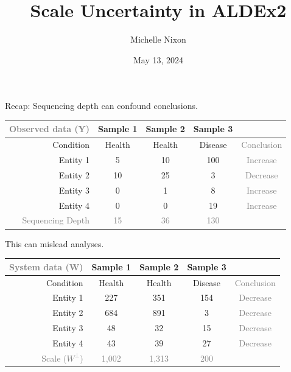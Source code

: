 \documentclass[
  ignorenonframetext,
]{beamer}
\title{Scale Uncertainty in ALDEx2}
\author{Michelle Nixon}
\date{May 13, 2024}
\begin{document}
\frame{\titlepage}

\begin{frame}{Recap: Sequencing depth can confound conclusions.}
\protect\hypertarget{recap-sequencing-depth-can-confound-conclusions.}{}
\begin{table}[h!]
\centering
\begin{tabular}{|r|c c c| c|}
\hline
\textcolor{gray}{Observed data (Y)} & Sample 1 & Sample 2 & Sample 3  &\\
\hline
Condition & Health & Health & Disease & \textcolor{gray}{Conclusion}\\
\hline
Entity 1 & 5 & 10 & 100 & \textcolor{gray}{Increase}\\
Entity 2 & 10 & 25 & 3 & \textcolor{gray}{Decrease}\\
Entity 3 & 0 & 1 & 8 & \textcolor{gray}{Increase}\\
Entity 4 & 0 & 0 & 19 &\textcolor{gray}{Increase}\\
\hline
\textcolor{gray}{Sequencing Depth} & \textcolor{gray}{15} & \textcolor{gray}{36} & \textcolor{gray}{130} &\\
\hline
\end{tabular}
\end{table}
\end{frame}

\begin{frame}{This can mislead analyses.}
\protect\hypertarget{this-can-mislead-analyses.}{}
\begin{table}[h!]
\centering
\begin{tabular}{|r|c c c| c|}
\hline
\textcolor{gray}{System data (W)} & Sample 1 & Sample 2 & Sample 3  & \\
\hline
Condition & Health & Health & Disease & \textcolor{gray}{Conclusion}\\
\hline
Entity 1 & 227 & 351 & 154 & \textcolor{gray}{Decrease}\\
Entity 2 & 684 & 891 & 3 & \textcolor{gray}{Decrease}\\
Entity 3 & 48 & 32 & 15 & \textcolor{gray}{Decrease}\\
Entity 4 & 43 & 39  & 27 &\textcolor{gray}{Decrease}\\
\hline
\textcolor{gray}{Scale ($W^\perp$)} & \textcolor{gray}{1,002} & \textcolor{gray}{1,313} & \textcolor{gray}{200} &\\
\hline
\end{tabular}
\end{table}
\end{frame}
\end{document}
